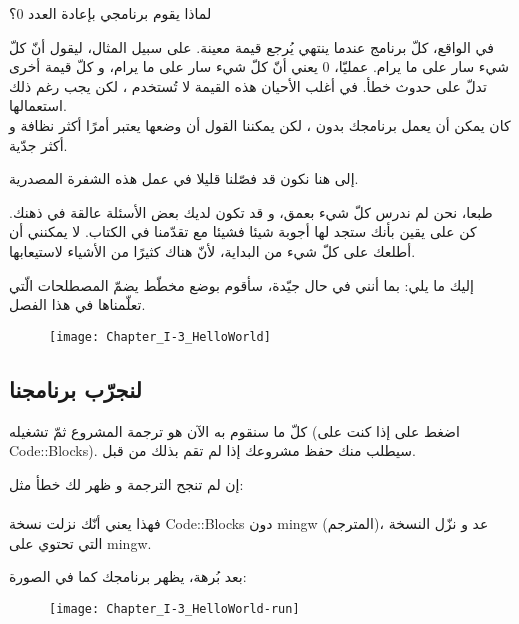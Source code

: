  \begin{question}
   لماذا يقوم برنامجي بإعادة العدد 0؟
 \end{question}

 في الواقع، كلّ برنامج عندما ينتهي يُرجع قيمة معينة. على سبيل المثال، ليقول أنّ كلّ شيء سار على ما يرام. عمليّا، 0 يعني  أنّ كلّ شيء سار على ما يرام، و كلّ قيمة أخرى تدلّ على حدوث خطأ. في أغلب الأحيان هذه القيمة لا تُستخدم ، لكن يجب رغم ذلك استعمالها.\\
 كان يمكن أن يعمل برنامجك بدون
، لكن يمكننا القول أن وضعها يعتبر أمرًا أكثر نظافة و أكثر جدّية.

إلى هنا نكون قد فصّلنا قليلا في عمل هذه الشفرة المصدرية.

طبعا، نحن لم ندرس كلّ شيء بعمق، و قد تكون لديك بعض الأسئلة عالقة في ذهنك. كن على يقين بأنك ستجد لها أجوبة شيئا فشيئا مع تقدّمنا في الكتاب. لا يمكنني أن أطلعك على كلّ شيء من البداية، لأنّ هناك كثيرًا من الأشياء لاستيعابها.

إليك ما يلي: بما أنني في حال جيّدة، سأقوم بوضع مخطّط يضمّ المصطلحات الّتي تعلّمناها في هذا الفصل.

\begin{figure}[H]
	\centering
	\texttt{[image: Chapter\_I-3\_HelloWorld]}
\end{figure}

\subsection{لنجرّب برنامجنا}

كلّ ما سنقوم به الآن هو ترجمة المشروع ثمّ تشغيله (اضغط على
 إذا كنت على
\textenglish{Code::Blocks}).
سيطلب منك حفظ مشروعك إذا لم تقم بذلك من قبل.

\begin{critical}
  إن لم تنجح الترجمة و ظهر لك خطأ مثل:\\
\\
فهذا يعني أنّك نزلت نسخة
\textenglish{Code::Blocks}
 دون
\textenglish{mingw}
 (المترجم)، عد و نزّل النسخة التي تحتوي على
\textenglish{mingw}.
\end{critical}

بعد بُرهة، يظهر برنامجك كما في الصورة:

\begin{figure}[H]
	\centering
	\texttt{[image: Chapter\_I-3\_HelloWorld-run]}
\end{figure}

